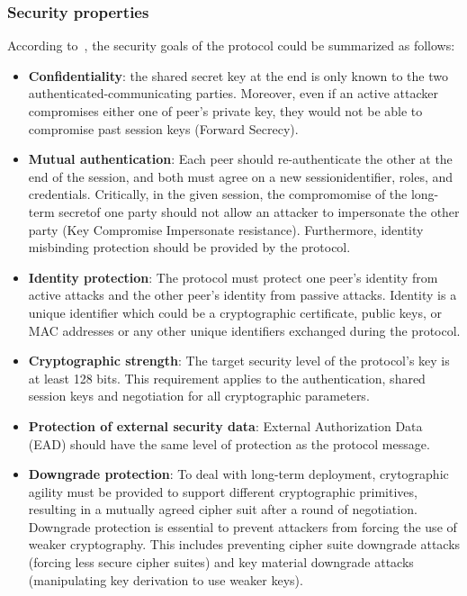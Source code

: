 \subsubsection{Security properties}
According to~\cite{edhoc-security-overview}, the security goals of the protocol
could be summarized as follows:
\begin{itemize}
    \item \textbf{Confidentiality}: the shared secret key at the end is only known
    to the two authenticated-communicating parties. Moreover, even if an active
    attacker compromises either one of peer's private key, they would not be able
    to compromise past session keys (Forward Secrecy).
    \item \textbf{Mutual authentication}: Each peer should re-authenticate the other
    at the end of the session, and both must agree on a new sessionidentifier, roles,
    and credentials. Critically, in the given session, the compromomise of the
    long-term secretof one party should not allow an attacker to impersonate the
    other party (Key Compromise Impersonate resistance). Furthermore, identity
    misbinding protection should be provided by the protocol.
    \item \textbf{Identity protection}: The protocol must protect one peer's identity
    from active attacks and the other peer's identity from passive attacks. Identity
    is a unique identifier which could be a cryptographic certificate, public keys, or
    MAC addresses or any other unique identifiers exchanged during the protocol.
    \item \textbf{Cryptographic strength}: The target security level of the protocol's
    key is at least 128 bits. This requirement applies to the authentication, shared
    session keys and negotiation for all cryptographic parameters.
    \item \textbf{Protection of external security data}: External Authorization Data (EAD)
    should have the same level of protection as the protocol message.
    \item \textbf{Downgrade protection}: To deal with long-term deployment,
    crytographic agility must be provided to support different cryptographic primitives,
    resulting in a mutually agreed cipher suit after a round of negotiation.
    Downgrade protection is essential to prevent
    attackers from forcing the use of weaker cryptography. This includes preventing
    cipher suite downgrade attacks (forcing less secure cipher suites) and key material
    downgrade attacks (manipulating key derivation to use weaker keys).
\end{itemize}

